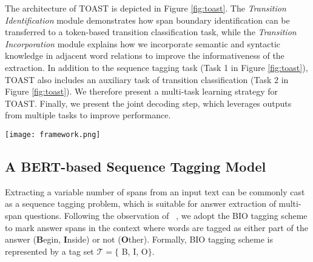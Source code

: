 \documentclass[a4paper]{cas-sc}
\newcommand{\1}[1]{\mathds{1}\left[#1\right]}
\newcommand{\figref}[1]{Figure \ref{#1}}
\begin{document}

The architecture of TOAST is depicted in \figref{fig:toast}.
The \emph{Transition Identification} module demonstrates how span boundary identification can be transferred to a token-based transition classification task, while the  \emph{Transition Incorporation} module explains how we incorporate semantic and syntactic knowledge in adjacent word relations to improve the informativeness of the extraction. 
In addition to the sequence tagging task (Task 1 in \figref{fig:toast}), TOAST also includes an auxiliary task of transition classification (Task 2 in \figref{fig:toast}). We therefore present a multi-task learning strategy for TOAST. 
Finally, we present the joint decoding step, which leverages outputs from multiple tasks to improve performance.


\begin{figure*}[thb!]
	\centering
	\texttt{[image: framework.png]}
	\caption{An illustration of TOAST framework architecture.}
	\label{fig:toast}
\end{figure*}
\subsection{A BERT-based Sequence Tagging Model}
\label{sec:basic}
Extracting a variable number of spans from an input text can be
commonly cast as a sequence tagging problem, 
which is suitable for answer extraction of multi-span questions.
Following the observation of ~\cite{li2022multispanqa}, 
we adopt the BIO
tagging scheme to mark answer spans in the context 
where words are tagged as either part of the answer (\textbf{B}egin, \textbf{I}nside) or not (\textbf{O}ther). 
Formally, BIO tagging scheme is represented by a tag set $\mathcal{T}=\{$ B, I, O$\}$.
\end{document}
